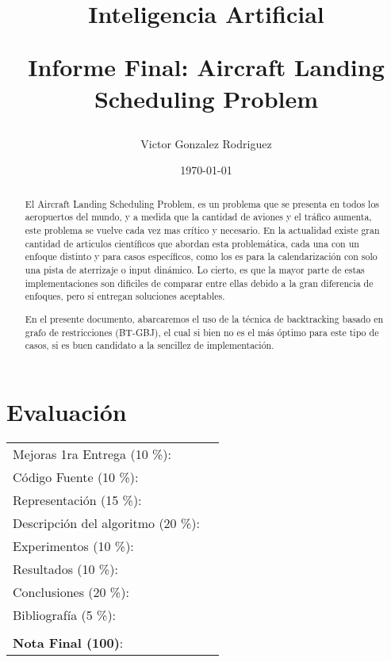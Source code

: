\documentclass[letter, 11pt]{article}
\begin{document}
\title{Inteligencia Artificial \\ \begin{Large}Informe Final: Aircraft Landing Scheduling Problem\end{Large}}
\author{Victor Gonzalez Rodriguez}
\date{\today}
\maketitle


\section*{Evaluaci\'on}

\begin{tabular}{ll}
Mejoras 1ra Entrega (10 \%): &  \underline{\hspace{2cm}}\\
C\'odigo Fuente (10 \%): &  \underline{\hspace{2cm}}\\
Representaci\'on (15 \%):  & \underline{\hspace{2cm}} \\
Descripci\'on del algoritmo (20 \%):  & \underline{\hspace{2cm}} \\
Experimentos (10 \%):  & \underline{\hspace{2cm}} \\
Resultados (10 \%):  & \underline{\hspace{2cm}} \\
Conclusiones (20 \%): &  \underline{\hspace{2cm}}\\
Bibliograf\'ia (5 \%): & \underline{\hspace{2cm}}\\
 &  \\
\textbf{Nota Final (100)}:   & \underline{\hspace{2cm}}
\end{tabular}

\begin{abstract}
El Aircraft Landing Scheduling Problem, es un problema que se presenta en todos los aeropuertos del mundo, y a medida que la cantidad de aviones y el tráfico aumenta, este problema se vuelve cada vez mas crítico y necesario. En la actualidad existe gran cantidad de articulos científicos que abordan esta problemática, cada una con un enfoque distinto y para casos específicos, como los es para la calendarización con solo una pista de aterrizaje o input dinámico. Lo cierto, es que la mayor parte de estas implementaciones son dificiles de comparar entre ellas debido a la gran diferencia de enfoques, pero si entregan soluciones aceptables.

En el presente documento, abarcaremos el uso de la técnica de backtracking basado en grafo de restricciones (BT-GBJ), el cual si bien no es el más óptimo para este tipo de casos, si es buen candidato a la sencillez de implementación.

\end{abstract}
\end{document}
